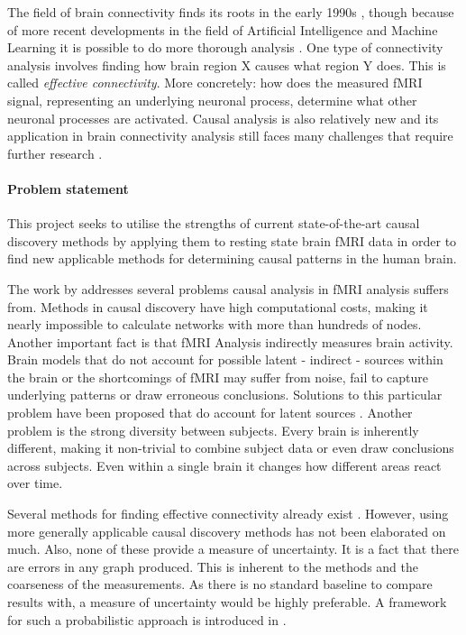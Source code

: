 \documentclass[a4paper, 10pt, english, twocolumn]{article}
\begin{document}
The field of brain connectivity finds its roots in the early 1990s \cite{friston1993functional, friston1994}, though because of more recent developments in the field of Artificial Intelligence and Machine Learning it is possible to do more thorough analysis \cite{vandenheuvel2010}.
One type of connectivity analysis involves finding how brain region X causes what region Y does. This is called \emph{effective connectivity}.
More concretely: how does the measured fMRI signal, representing an underlying neuronal process, determine what other neuronal processes are activated.
Causal analysis is also relatively new and its application in brain connectivity analysis still faces many challenges that require further research \cite{ramsey2010}.

\paragraph{Problem statement}
This project seeks to utilise the strengths of current state-of-the-art causal discovery methods by applying them to resting state brain fMRI data in order to find new applicable methods for determining causal patterns in the human brain.

The work by \cite{ramsey2010} addresses several problems causal analysis in fMRI analysis suffers from.
Methods in causal discovery have high computational costs, making it nearly impossible to calculate networks with more than hundreds of nodes.
Another important fact is that fMRI Analysis indirectly measures brain activity.
Brain models that do not account for possible latent - indirect - sources within the brain or the shortcomings of fMRI may suffer from noise, fail to capture underlying patterns or draw erroneous conclusions.
Solutions to this particular problem have been proposed that do account for latent sources \cite{ramsey2010, waldorp2011}.
Another problem is the strong diversity between subjects.
Every brain is inherently different, making it non-trivial to combine subject data or even draw conclusions across subjects.
Even within a single brain it changes how different areas react over time.

Several methods for finding effective connectivity already exist \cite{mclntosh1994, harrison2003, friston2003, roebroeck2005}.
However, using more generally applicable causal discovery methods has not been elaborated on much.
Also, none of these provide a measure of uncertainty.
It is a fact that there are errors in any graph produced.
This is inherent to the methods and the coarseness of the measurements.
As there is no standard baseline to compare results with, a measure of uncertainty would be highly preferable.
A framework for such a probabilistic approach is introduced in \cite{claassen2012}.
\end{document}
